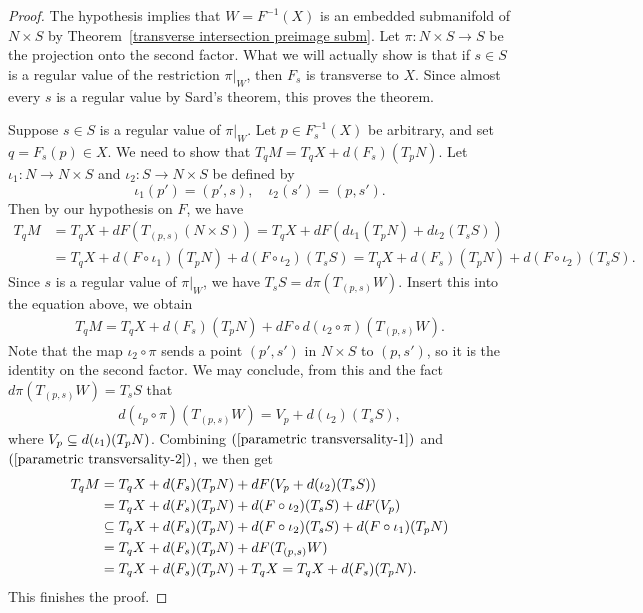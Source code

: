 \begin{proof}
The hypothesis implies that $W=F^{-1}(X)$ is an embedded submanifold of $N\times S$ by Theorem~\ref{transverse intersection preimage subm}. Let $\pi:N\times S\to S$ be the projection onto the second factor. What we will actually show is that if $s\in S$ is a regular value of the restriction $\pi|_W$, then $F_s$ is transverse to $X$. Since almost every $s$ is a regular value by Sard's theorem, this proves the theorem.\par
Suppose $s\in S$ is a regular value of $\pi|_W$. Let $p\in F_s^{-1}(X)$ be arbitrary, and set $q=F_s(p)\in X$. We need to show that $T_qM=T_qX+d(F_s)(T_pN)$. Let $\iota_1:N\to N\times S$ and $\iota_2:S\to N\times S$ be defined by
\[\iota_1(p')=(p',s),\quad \iota_2(s')=(p,s').\]
Then by our hypothesis on $F$, we have
\begin{align*}
T_qM&=T_qX+dF(T_{(p,s)}(N\times S))=T_qX+dF(d\iota_1(T_pN)+d\iota_2(T_sS))\\
&=T_qX+d(F\circ\iota_1)(T_pN)+d(F\circ\iota_2)(T_sS)=T_qX+d(F_s)(T_pN)+d(F\circ\iota_2)(T_sS).
\end{align*}
Since $s$ is a regular value of $\pi|_W$, we have $T_sS=d\pi(T_{(p,s)}W)$. Insert this into the equation above, we obtain
\begin{align}\label{parametric transversality-1}
T_qM=T_qX+d(F_s)(T_pN)+dF\circ d(\iota_2\circ\pi)(T_{(p,s)}W).
\end{align}
Note that the map $\iota_2\circ\pi$ sends a point $(p',s')$ in $N\times S$ to $(p,s')$, so it is the identity on the second factor. We may conclude, from this and the fact $d\pi(T_{(p,s)}W)=T_sS$ that
\begin{align}\label{parametric transversality-2}
d(\iota_p\circ\pi)(T_{(p,s)}W)=V_p+d(\iota_2)(T_sS),
\end{align}
where $V_p\subseteq d(\iota_1)(T_pN)$. Combining $(\ref{parametric transversality-1})$ and $(\ref{parametric transversality-2})$, we then get
\begin{align*}
T_qM&=T_qX+d(F_s)(T_pN)+dF(V_p+d(\iota_2)(T_sS))\\
&=T_qX+d(F_s)(T_pN)+d(F\circ\iota_2)(T_sS)+dF(V_p)\\
&\subseteq T_qX+d(F_s)(T_pN)+d(F\circ\iota_2)(T_sS)+d(F\circ\iota_1)(T_pN)\\
&=T_qX+d(F_s)(T_pN)+dF(T_{(p,s)}W)\\
&=T_qX+d(F_s)(T_pN)+T_qX=T_qX+d(F_s)(T_pN).
\end{align*}
This finishes the proof.
\end{proof}
